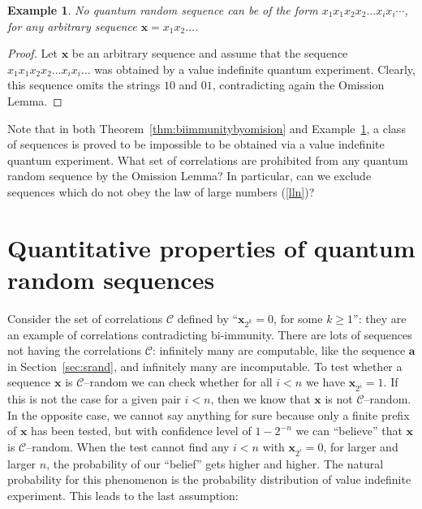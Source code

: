 \documentclass[%
 preprint,
 showpacs,
 showkeys,
 preprintnumbers,
  amsmath,amssymb,
  aps,
 pra,
  longbibliography,
  floatfix,
 ]{revtex4-1}
\theoremstyle{plain}
\newtheorem{example}[theorem]{Example}
\newcommand{\x}{\mathbf{x}}
\begin{document}
\begin{example} \label{ex:doubleseq} No quantum random sequence can be of the form $x_1x_1x_2x_2 \dots x_ix_i \cdots $, for  any arbitrary sequence $\x=x_1x_2\dots$.
\end{example}

\begin{proof}
Let $\x$ be an arbitrary sequence and assume that the sequence $x_1x_1x_2x_2 \dots x_ix_i \dots $ was obtained by a value indefinite quantum experiment. Clearly, this sequence omits the strings $10$ and $01$,  contradicting again the Omission Lemma.
\end{proof}

Note that in both Theorem~\ref{thm:biimmunitybyomision} and Example~\ref{ex:doubleseq}, a class of sequences is proved to be impossible to be obtained via a value indefinite quantum experiment.  What set of correlations are prohibited from any quantum random sequence by the Omission Lemma? In particular, can we exclude sequences which do not obey the law of large numbers (\ref{lln})?



\section{Quantitative properties of quantum random sequences}


 Consider the set of correlations  $\mathcal{C}$   defined by ``$\x_{2^{k}}=0$, for some $k\ge 1$'': they are an example of correlations contradicting bi-immunity. There are lots of sequences not having the correlations $\mathcal{C}$:  infinitely many are computable,  like the sequence ${\mathbf a}$ in Section~\ref{sec:srand},  and infinitely many are incomputable.
 To test whether a sequence $\x$ is $\mathcal{C}$--random we can check whether for all $i<n$ we have $\x_{2^{i}}=1$. If this is not the case for a given pair $i<n$, then
we know  that $\x$ is not $\mathcal{C}$--random. In the opposite case, we cannot say anything for sure because only a finite prefix of $\x$ has been tested, but
with confidence level of $1-2^{-n}$  we can ``believe'' that $\x$ is $\mathcal{C}$--random. When the test cannot find any $i<n$ with $\x_{2^{i}}=0$, for larger and larger $n$, the probability of our  ``belief'' gets higher and higher. The natural probability for this phenomenon is the
probability distribution of value indefinite experiment. This leads to the last assumption:

\bigskip
\end{document}
